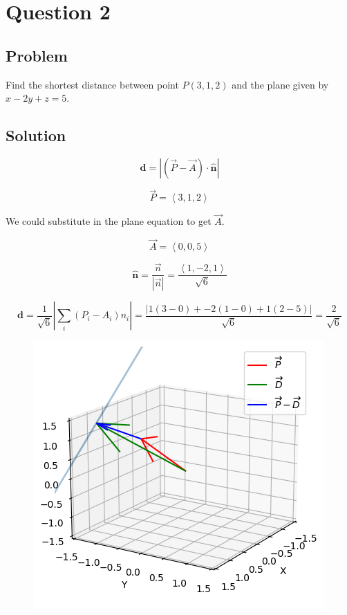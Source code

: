 \documentclass[12pt]{article}
\begin{document}
\section{Question 2}

\subsection{Problem}

Find the shortest distance between point \(P(3, 1, 2)\) and the plane given by
\(x - 2y + z = 5\).

\subsection{Solution}

\[\boldsymbol{d}=|(\vec{P}-\vec{A}) \cdot \widehat{\boldsymbol{n}}|\]

\[
    \vec{P} = \left\langle3, 1, 2\right\rangle
\]

We could substitute in the plane equation to get \(\vec{A}\).

\[
    \vec{A} = \left\langle 0, 0, 5\right\rangle
\]

\[
    \widehat{\boldsymbol{n}} = \frac{\vec{n}}{\left\lvert \vec{n} \right\rvert } = \frac{\left\langle 1, -2, 1\right\rangle}{\sqrt{6}}
\]

\[
    \boldsymbol{d} = \frac{1}{\sqrt{6}}\left\lvert \sum_i {(P_i - A_i)n_i}\right\rvert
    = \frac{\left\lvert 1(3 - 0) + -2(1 - 0) + 1(2 - 5)\right\rvert }{\sqrt{6}}
    = \frac{2}{\sqrt{6}}
\]

\begin{figure}[H]
    \includegraphics[width=\linewidth]{Q2.png}\label{fig:Q2}
\end{figure}
\end{document}
